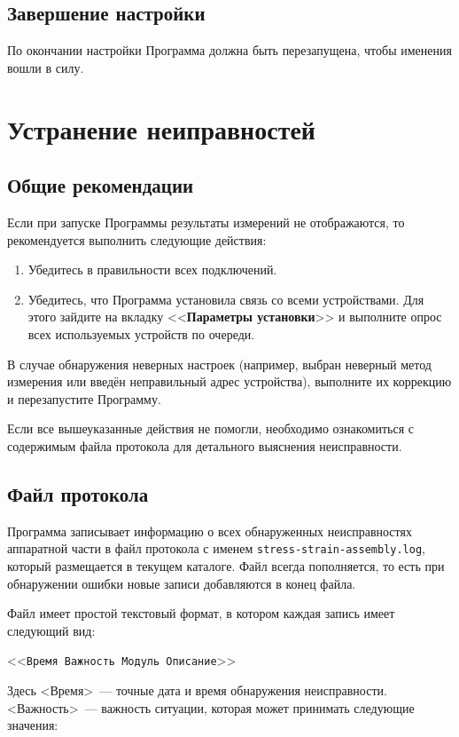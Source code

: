 \documentclass[12pt, a4paper, twocolumn]{report}
\newcommand{\PROGNAME}{stress-strain-assembly}
\newcommand{\CTL}[1]{<<{\bf #1}>>}
\newcommand{\CMD}[1]{<<{\tt #1}>>}
\newcommand{\FILENAME}[1]{{\tt #1}}
\begin{document}
\section{Завершение настройки}

По окончании настройки Программа должна быть перезапущена, чтобы именения вошли в силу.

\chapter{Устранение неиправностей}

\section{Общие рекомендации}

Если при запуске Программы результаты измерений не отображаются, то рекомендуется выполнить следующие действия:

\begin{enumerate}
\item Убедитесь в правильности всех подключений.
\item Убедитесь, что Программа установила связь со всеми устройствами. Для этого зайдите на вкладку \CTL{Параметры установки} и выполните опрос всех используемых устройств по очереди.
\end{enumerate}

В случае обнаружения неверных настроек (например, выбран неверный метод измерения или введён неправильный адрес устройства), выполните их коррекцию и перезапустите Программу.

Если все вышеуказанные действия не помогли, необходимо ознакомиться с содержимым файла протокола для детального выяснения неисправности.

\section{Файл протокола}

Программа записывает информацию о всех обнаруженных неисправностях аппаратной части в файл протокола с именем \FILENAME{\PROGNAME{}.log}, который размещается в текущем каталоге. Файл всегда пополняется, то есть при обнаружении ошибки новые записи добавляются в конец файла.

Файл имеет простой текстовый формат, в котором каждая запись имеет следующий вид:

\CMD{Время Важность Модуль Описание}

Здесь <Время>~--- точные дата и время обнаружения неисправности. <Важность>~--- важность ситуации, которая может принимать следующие значения:
\end{document}
